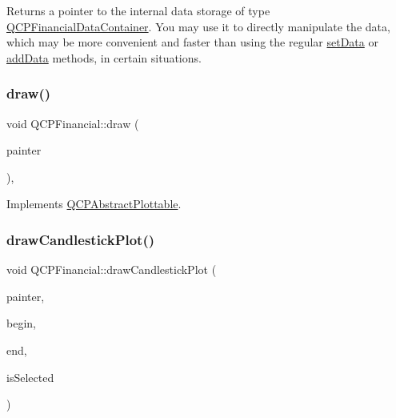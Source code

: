 Returns a pointer to the internal data storage of type \mbox{\hyperlink{qcustomplot_8h_ae36e482e04f19a54782f01ab38c354a6}{Q\+C\+P\+Financial\+Data\+Container}}. You may use it to directly manipulate the data, which may be more convenient and faster than using the regular \mbox{\hyperlink{class_q_c_p_financial_a72089e75b8a50d18097526c3c79fdb85}{set\+Data}} or \mbox{\hyperlink{class_q_c_p_financial_a372ac031e44a7a6c912d203556af96f7}{add\+Data}} methods, in certain situations. \mbox{\label{class_q_c_p_financial_a4d62b7a618d609321adb5f5f1e31f446}} 
\subsubsection{\texorpdfstring{draw()}{draw()}}
{\footnotesize\ttfamily void Q\+C\+P\+Financial\+::draw (\begin{DoxyParamCaption}\item[{\mbox{\hyperlink{class_q_c_p_painter}{Q\+C\+P\+Painter}} $\ast$}]{painter }\end{DoxyParamCaption})\hspace{0.3cm}{\ttfamily [protected]}, {\ttfamily [virtual]}}



Implements \mbox{\hyperlink{class_q_c_p_abstract_plottable_a453f676a5cee7bf846c5f0fa05ea84b3}{Q\+C\+P\+Abstract\+Plottable}}.

\mbox{\label{class_q_c_p_financial_ade6b703369d8acb3bfa0b8e244df4b06}} 
\subsubsection{\texorpdfstring{drawCandlestickPlot()}{drawCandlestickPlot()}}
{\footnotesize\ttfamily void Q\+C\+P\+Financial\+::draw\+Candlestick\+Plot (\begin{DoxyParamCaption}\item[{\mbox{\hyperlink{class_q_c_p_painter}{Q\+C\+P\+Painter}} $\ast$}]{painter,  }\item[{const \mbox{\hyperlink{class_q_c_p_data_container_ae40a91f5cb0bcac61d727427449b7d15}{Q\+C\+P\+Financial\+Data\+Container\+::const\+\_\+iterator}} \&}]{begin,  }\item[{const \mbox{\hyperlink{class_q_c_p_data_container_ae40a91f5cb0bcac61d727427449b7d15}{Q\+C\+P\+Financial\+Data\+Container\+::const\+\_\+iterator}} \&}]{end,  }\item[{bool}]{is\+Selected }\end{DoxyParamCaption})\hspace{0.3cm}{\ttfamily [protected]}}

